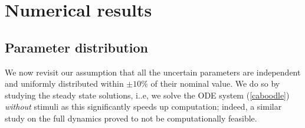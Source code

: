 \section{Numerical results}
\label{sec:results}

\subsection{Parameter distribution}
\label{sec:param_sampling}

We now revisit our assumption that all the uncertain parameters are independent and uniformly distributed within $\pm 10\%$ of  their nominal value. We do so by studying the steady state solutions, i..e, we solve the ODE system (\ref{caboodle}) {\sl without} stimuli as this significantly speeds up computation; indeed, a similar study on the full dynamics proved to not be computationally feasible.  

